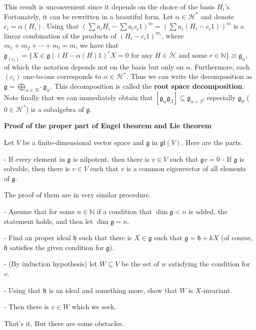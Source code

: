 \documentclass{article}
\newcommand{\NaN}{\mathbb{N}}
\newcommand{\SBar}{\;|\;}
\newcommand{\lie}[1]{\mathfrak{#1}}
\begin{document}
This result is unconvenient since it depends on the choice of the basis $H_i$'s.
Fortunately, it can be rewritten in a beautiful form.
Let $\alpha \in \mathcal{H}^\ast$ and denote $c_i = \alpha(H_i)$.
Using that $(\sum a_i H_i - \sum a_i c_i 1)^m = (\sum a_i(H_i - c_i 1))^m$ is a linear combination of the products of $(H_i - c_i 1)^{m_i}$, where $m_1 + m_2 + \cdots + m_l = m$, we have that $\lie{g}_{(c_i)} = \{X \in \lie{g} \SBar (H - \alpha(H) 1)^r X = 0 \textrm{ for any $H \in \mathcal{H}$ and some $r \in \NaN$}\} \equiv \lie{g}_\alpha$, of which the notation depends not on the basis but only on $\alpha$.
Furthermore, each $(c_i)$ one-to-one corresponds to $\alpha \in \mathcal{H}^\ast$.
Thus we can write the decomposition as $\lie{g} = \bigoplus_{\alpha \in \mathcal{H}^\ast} \lie{g}_\alpha$.
This decomposition is called the \textbf{root space decomposition}.
Note finally that we can immediately obtain that $[\lie{g}_\alpha \lie{g}_\beta] \subseteq \lie{g}_{\alpha + \beta}$; especially $\lie{g}_0$ ($0 \in \mathcal{H}^*$) is a subalgebra of $\lie{g}$.

\newpage

\textbf{Proof of the proper part of Engel theorem and Lie theorem}

Let $V$ be a finite-dimensional vector space and $\lie{g}$ in $\lie{gl}(V)$. Here are the parts.

- If every element in $\lie{g}$ is nilpotent, then there is $v \in V$ such that $\lie{g}v = 0$
- If $\lie{g}$ is solvable, then there is $v \in V$ such that $v$ is a common eigenvector of all elements of $\lie{g}$.

The proof of them are in very similar procedure.

- Assume that for some $n \in \NaN$ if a condition that $\dim{\lie{g}} < n$ is added, the statement holds, and then let $\dim{\lie{g}} = n$.

- Find an proper ideal $\lie{h}$ such that there is $X \in \lie{g}$ such that $\lie{g} = \lie{h} + kX$ (of course, $\lie{h}$ satisfies the given condition for $\lie{g}$).

- (By induction hypothesis) let $W \subseteq V$ be the set of $w$ satisfying the condition for $v$.

- Using that $\lie{h}$ is an ideal and something more, show that $W$ is $X$-invariant.

- Then there is $v \in W$ which we seek.

That's it. But there are some obstacles.
\end{document}
